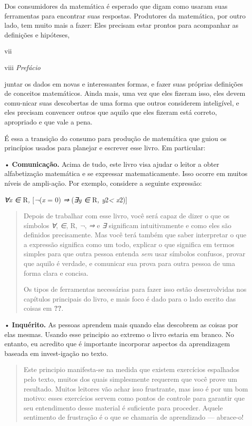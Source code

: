 \documentclass[
]{article}
\begin{document}
Dos consumidores da matemática é esperado que digam como usaram suas
ferramentas para encontrar suas respostas. Produtores da matemática, por
outro lado, tem muito mais a fazer: Eles precisam estar prontos para
acompanhar as definições e hipóteses,

vii

viii \emph{Prefácio}

juntar os dados em novas e interessantes formas, e fazer suas próprias
definições de conceitos matemáticos. Ainda mais, uma vez que eles
fizeram isso, eles devem comu-nicar suas descobertas de uma forma que
outros considerem inteligível, e eles precisam convencer outros que
aquilo que eles fizeram está correto, apropriado e que vale a pena.

É essa a transição do consumo para produção de matemática que guiou os
princípios usados para planejar e escrever esse livro. Em particular:

• \textbf{Comunicação.} Acima de tudo, este livro visa ajudar o leitor a
obter alfabetização matemática e se expressar matematicamente. Isso
ocorre em muitos níveis de ampli-ação. Por exemplo, considere a seguinte
expressão:

\emph{∀x ∈} R\emph{,} {[}\emph{¬}(\emph{x} = 0) \emph{⇒} (\emph{∃y ∈}
R\emph{, y}2\emph{\textless{} x}2){]}

\begin{quote}
Depois de trabalhar com esse livro, você será capaz de dizer o que os
símbolos \emph{∀}, \emph{∈}, R, \emph{¬}, \emph{⇒} e \emph{∃} significam
intuitivamente e como eles são definidos precisamente. Mas você terá
também que saber interpretar o que a expressão significa como um todo,
explicar o que significa em termos simples para que outra pessoa entenda
\emph{sem} usar símbolos confusos, provar que aquilo é verdade, e
comunicar sua prova para outra pessoa de uma forma clara e concisa.

Os tipos de ferramentas necessárias para fazer isso estão desenvolvidas
nos capítulos principais do livro, e mais foco é dado para o lado
escrito das coisas em \textbf{??}.
\end{quote}

• \textbf{Inquérito.} As pessoas aprendem mais quando elas descobrem as
coisas por elas mesmas. Usando esse principio ao extremo o livro estaria
em branco. No entanto, eu acredito que é importante incorporar aspectos
da aprendizagem baseada em invest-igação no texto.

\begin{quote}
Este principio manifesta-se na medida que existem exercícios espalhados
pelo texto, muitos dos quais simplesmente requerem que você prove um
resultado. Muitos leitores vão achar isso frustrante, mas isso é por um
bom motivo: esses exercícios servem como pontos de controle para
garantir que seu entendimento desse material é suficiente para proceder.
Aquele sentimento de frustração é o que se chamaria de aprendizado ---
abrace-o!
\end{quote}
\end{document}

